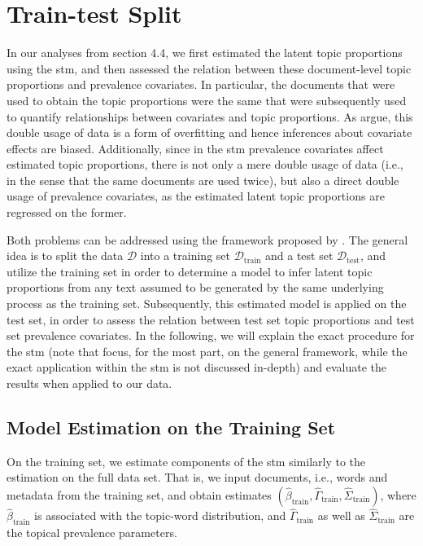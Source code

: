 \section{Train-test Split}

In our analyses from section 4.4, we first estimated the latent topic proportions using the stm, and then assessed the relation between these document-level topic proportions and prevalence covariates. In particular, the documents that were used to obtain the topic proportions were the same that were subsequently used to quantify relationships between covariates and topic proportions. As \cite{egami2018make} argue, this double usage of data is a form of overfitting and hence inferences about covariate effects are biased. Additionally, since in the stm prevalence covariates affect estimated topic proportions, there is not only a mere double usage of data (i.e., in the sense that the same documents are used twice), but also a direct double usage of prevalence covariates, as the estimated latent topic proportions are regressed on the former.

Both problems can be addressed using the framework proposed by \cite{egami2018make}. The general idea is to split the data $\mathcal{D}$ into a training set $\mathcal{D}_{\text{train}}$ and a test set $\mathcal{D}_{\text{test}}$, and utilize the training set in order to determine a model to infer latent topic proportions from any text assumed to be generated by the same underlying process as the training set. Subsequently, this estimated model is applied on the test set, in order to assess the relation between test set topic proportions and test set prevalence covariates. In the following, we will explain the exact procedure for the stm (note that \cite{egami2018make} focus, for the most part, on the general framework, while the exact application within the stm is not discussed in-depth) and evaluate the results when applied to our data. 

\subsection{Model Estimation on the Training Set}

On the training set, we estimate components of the stm similarly to the estimation on the full data set. That is, we input documents, i.e., words and metadata from the training set, and obtain estimates $(\hat{\beta}_{\text{train}}, \hat{\Gamma}_{\text{train}}, \hat{\Sigma}_{\text{train}})$, where $\hat{\beta}_{\text{train}}$ is associated with the topic-word distribution, and $\hat{\Gamma}_{\text{train}}$ as well as $\hat{\Sigma}_{\text{train}}$ are the topical prevalence parameters. 


